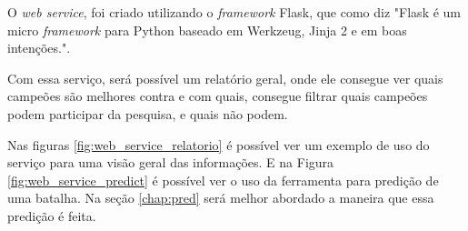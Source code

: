 O \textit{web service}, foi criado utilizando o \textit{framework} Flask, que como \citet[tradução nossa]{flask} diz "Flask é um micro \textit{framework} para Python baseado em Werkzeug, Jinja 2 e em boas intenções.".

Com essa serviço, será possível um relatório geral, onde ele consegue ver quais campeões são melhores contra e com quais, consegue filtrar quais campeões podem participar da pesquisa, e quais não podem. 

Nas figuras \ref{fig:web_service_relatorio} é possível ver um exemplo de uso do serviço para uma visão geral das informações. E na Figura \ref{fig:web_service_predict} é possível ver o uso da ferramenta para predição de uma batalha. Na seção \ref{chap:pred} será melhor abordado a maneira que essa predição é feita.



